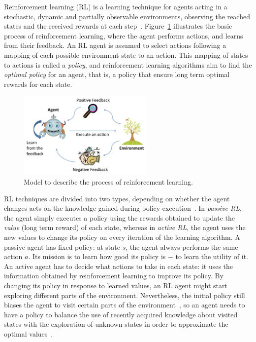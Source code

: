 Reinforcement learning (RL) is a learning technique for agents acting in a stochastic, dynamic and partially observable environments, observing the reached states and the received rewards at each step~\cite{sutton1998reinforcement}. 
Figure~\ref{fig:rl} illustrates the basic process of reinforcement learning, where the agent performs actions, and learns from their feedback. 
An RL agent is assumed to select actions following a mapping of each possible environment state to an action. 
This mapping of states to actions is called a \emph{policy}, and reinforcement learning algorithms aim to find the \emph{optimal policy} for an agent, that is, a policy that ensure long term optimal rewards for each state. 

\begin{figure}[ht]
\centering
\includegraphics[width=250px]{images/rl}
\caption{Model to describe the process of reinforcement learning.}
\label{fig:rl}
\end{figure}

RL techniques are divided into two types, depending on whether the agent changes acts on the knowledge gained during policy execution~\cite{russell1995artificial}. 
In \emph{passive RL}, the agent simply executes a policy using the rewards obtained to update the \emph{value} (long term reward) of each state, whereas in \emph{active RL}, the agent uses the new values to change its policy on every iteration of the learning algorithm. 
A passive agent has fixed policy: at state $s$, the agent always performs the same action $a$.
Its mission is to learn how good its policy is $-$ to learn the utility of it.
An active agent has to decide what actions to take in each state:
it uses the information obtained by reinforcement learning to improve its policy. 
By changing its policy in response to learned values, an RL agent might start exploring different parts of the environment. 
Nevertheless, the initial policy still biases the agent to visit certain parts of the environment~\cite{russell1995artificial}, so an agent needs to have a policy to balance the use of recently acquired knowledge about visited states with the exploration of unknown states in order to approximate the optimal values~\cite{ghory2004boardgames}. 




